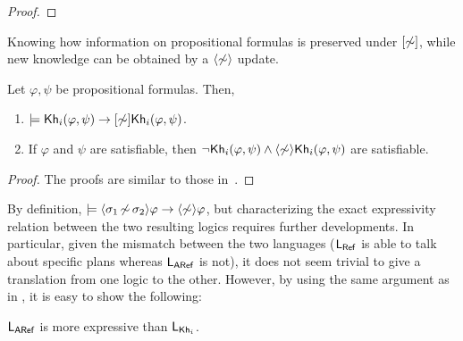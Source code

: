 \begin{proof}
%
%
%
\end{proof}

Knowing how information on propositional formulas is preserved under $[\not\sim]$, while new knowledge can be obtained by a $\langle \not\sim \rangle$ update.
\medskip

\begin{proposition}\label{prop:aref-preserves-gains}
Let $\varphi,\psi$ be propositional formulas. Then, 
\begin{enumerate}
\item\label{itm:aref:preservesknowledge} $\models {\sf Kh}_i(\varphi,\psi) \rightarrow [\not\sim]{\sf Kh}_i(\varphi,\psi)$.
\item\label{itm:aref:gainsknowledge} If $\varphi$ and $\psi$ are satisfiable, then $\neg{\sf Kh}_i(\varphi,\psi) \wedge \langle \not\sim \rangle{\sf Kh}_i(\varphi,\psi)$ are satisfiable.
\end{enumerate}
\end{proposition}
\begin{proof}
The proofs are similar to those in~.
\end{proof}

By definition, $\models \langle \sigma_1{\,\not\sim\,}\sigma_2 \rangle\varphi \rightarrow \langle \not\sim \rangle\varphi$, but characterizing the exact expressivity relation between the two resulting logics requires further developments.
In particular, given the mismatch between the two languages ($\mathsf{L_{Ref}}$ is able to talk about specific plans whereas $\mathsf{L_{ARef}}$ is not), it does not seem trivial to give a translation from one logic to the other.
However, by using the same argument as in , it is easy to show the following:

\medskip

\begin{proposition}\label{prop:exparef}
$\mathsf{L_{ARef}}$ is more expressive than $\mathsf{L}_{{\sf Kh}_i}$.
\end{proposition}


